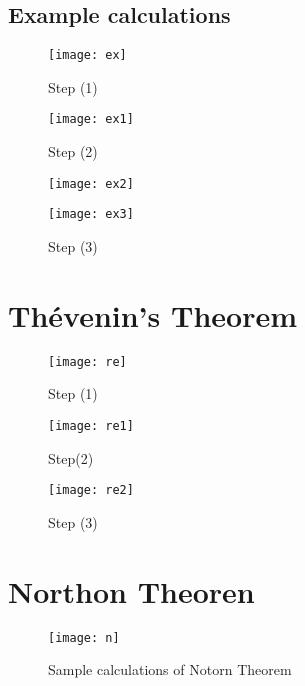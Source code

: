 \documentclass[11pt,a4paper, twocolumn]{article}
\begin{document}
	\subsection{Example calculations}
	
	\begin{figure}[!h]
	\texttt{[image: ex]}
	\caption{Step (1)}
	\texttt{[image: ex1]}\caption{Step (2)}
	
	
	\end{figure}
	
	\begin{figure}[H]
	\texttt{[image: ex2]}
	\caption{Step (3)}
	\texttt{[image: ex3]}
	\end{figure}

	
\section{Th\'{e}venin's Theorem}

	\begin{figure}[H]
	\texttt{[image: re]}
	\caption{Step (1)}
	\end{figure}
	
	\begin{figure}[H]
	
	\texttt{[image: re1]}
	\caption{ Step(2)}
	\end{figure}
	
	\begin{figure}[H]
	\texttt{[image: re2]}
	\caption{Step (3)}
	\end{figure}

\section{Northon Theoren}
	\begin{figure}[H]
	\centering
	\texttt{[image: n]}
	\caption{Sample calculations of Notorn Theorem}
	
	\end{figure}

	
	
	
	
	
	
	
\end{document}
